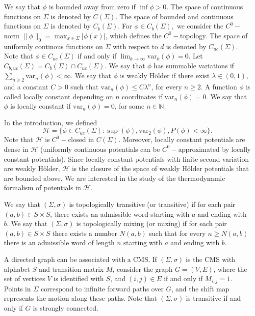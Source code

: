 \documentclass[letterpaper,11pt]{amsart}
\theoremstyle{plain}
\theoremstyle{plain}
\theoremstyle{definition}
\theoremstyle{remark}
\def\N{{\mathbb N}}
\def\H{{\mathcal H}}
\begin{document}
We say that $\phi$ is bounded away from zero if   $\inf \phi>0$. The space of continuous functions on $\Sigma$ is denoted by $C(\Sigma)$.  The space of bounded and continuous functions on $\Sigma$ is denoted by $C_b(\Sigma)$. For $\phi\in C_b(\Sigma),$ we consider the $C^0-$norm $\|\phi\|_0=\max_{x\in\Sigma}|\phi(x)|$, which defines the $C^0-$topology. The space of uniformly continous functions on $\Sigma$ with respect to $d$ is denoted by $C_{uc}(\Sigma)$. Note that $\phi\in C_{uc}(\Sigma)$ if and only if $\lim_{k\to\infty} \text{var}_k(\phi)=0$. Let $C_{b, uc}(\Sigma)=C_b(\Sigma)\cap C_{uc}(\Sigma)$. We say that $\phi$ has summable variations if $\sum_{n\ge 2} \text{var}_n(\phi)<\infty$. We say that $\phi$ is  weakly H\"older if there exist $\lambda\in (0,1),$ and a constant $C>0$ such that $\text{var}_n(\phi)\le C \lambda^n$, for every $n\ge 2$. A function $\phi$ is called locally constant depending on $n$ coordinates if $\text{var}_n(\phi)=0$.  We say that $\phi$ is locally constant if $\text{var}_n(\phi)=0$, for some $n\in\N$. 

In the introduction, we defined
$$\label{H}\H=\{\phi\in C_{uc}(\Sigma): \sup(\phi), \text{var}_2(\phi),P(\phi)<\infty\}.$$
Note that $\H$ is $C^0-$closed in $C(\Sigma)$. Moreover, locally constant potentials are dense in $\H$ (uniformly continuous potentials can be $C^0-$approximated by locally constant potentials). Since locally constant potentials with finite second variation are weakly H\"older, $\H$ is the closure of the space of  weakly Hölder potentials that are bounded above. We are interested in the study of the thermodynamic formalism of potentials in $\H$.

We say that $(\Sigma, \sigma)$ is topologically transitive (or transitive) if for each pair $(a,b) \in S \times S$, there exists an admissible word starting with $a$ and ending with $b$. We say that $(\Sigma, \sigma)$ is topologically mixing (or mixing) if for each pair $(a,b) \in S \times S$ there exists a number $N(a,b)$ such that for every $n \geq N(a,b)$ there is an admissible word of length $n$ starting with $a$ and ending with $b$.

A directed graph can be associated with a CMS. If $(\Sigma, \sigma)$ is the CMS with alphabet $S$ and transition matrix $M$, consider the graph $G = (V, E)$, where the set of vertices $V$ is identified with $S$, and $(i, j) \in E$ if and only if $M_{i, j} = 1$. Points in $\Sigma$ correspond to infinite forward paths over $G$, and the shift map represents the motion along these paths. Note that $(\Sigma, \sigma)$ is transitive if and only if $G$ is strongly connected.
\end{document}
